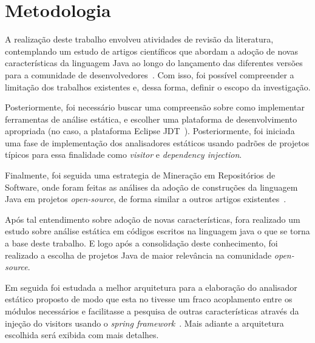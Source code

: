 %


\section{Metodologia}
    
    A realização deste trabalho envolveu atividades de revisão da literatura, contemplando um estudo 
    de artigos científicos que abordam a adoção de novas características da linguagem Java ao longo do 
    lançamento das diferentes versões para a comunidade de desenvolvedores~\cite{Schaefer:ACM2009, Dyer:2013, Parnin:ACM2011, Overbey:2009, Dyer:ACM2014, Bracha:ACM1998, bonifacio:scam2015}. Com isso, foi 
    possível compreender a limitação dos trabalhos existentes e, dessa forma, definir o escopo da 
    investigação. 
    
    Posteriormente, foi necessário buscar uma compreensão sobre como implementar ferramentas de 
    análise estática, e escolher uma plataforma de desenvolvimento apropriada (no caso, a plataforma 
    Eclipse JDT~\cite{EclipseJDT}). Posteriormente, foi iniciada uma fase de implementação dos analisadores estáticos usando padrões de projetos típicos para essa finalidade como  \textit{visitor} e \textit{dependency injection}.
    
     Finalmente, foi seguida uma estrategia de Mineração em Repositórios de Software, onde foram 
     feitas as análises da adoção de construções da linguagem Java em projetos \textit{open-source}, de forma 
     similar a outros artigos existentes~\cite{Schaefer:ACM2010,pinto-jss:2015,donovan:2004,dinklage:2004, Schaefer:ACM2009, Schaefer:ACM2010, Overbey:2009, Wichmann95industrialperspective, Ayewah:2008:USA:1439186.1439221, bracha1998gj}. 
     
	
	Após tal entendimento sobre adoção de novas características, fora realizado um estudo sobre análise estática em códigos escritos na linguagem java o que se torna a base deste trabalho. E logo após a consolidação deste conhecimento, foi realizado a escolha de projetos Java de maior relevância na comunidade \textit{open-source}.
	
	Em seguida foi estudada a melhor arquitetura para a elaboração do analisador estático proposto de modo que esta no tivesse um fraco acoplamento entre os módulos necessários e facilitasse a pesquisa de outras características através da injeção do visitors \cite{Gamma:1995} usando o \textit{spring framework}~\cite{SPRING_REF}. Mais adiante a arquitetura escolhida será exibida com mais detalhes.
